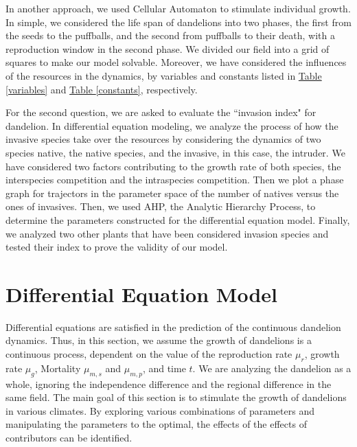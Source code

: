 \documentclass[12pt]{article}
\begin{document}
In another approach, we used Cellular Automaton to stimulate individual growth. In simple, we considered the life span of dandelions into two phases, the first from the seeds to the puffballs, and the second from puffballs to their death, with a reproduction window in the second phase. We divided our field into a grid of squares to make our model solvable. Moreover, we have considered the influences of the resources in the dynamics, by variables and constants listed in \hyperref[variables]{Table \ref*{variables}} and \hyperref[constants]{Table \ref*{constants}}, respectively.

For the second question, we are asked to evaluate the ``invasion index" for dandelion. In differential equation modeling, we analyze the process of how the invasive species take over the resources by considering the dynamics of two species native, the native species, and the invasive, in this case, the intruder. We have considered two factors contributing to the growth rate of both species, the interspecies competition and the intraspecies competition. Then we plot a phase graph for trajectors in the parameter space of the number of natives versus the ones of invasives. Then, we used AHP, the Analytic Hierarchy Process, to determine the parameters constructed for the differential equation model. Finally, we analyzed two other plants that have been considered invasion species and tested their index to prove the validity of our model.

\section{Differential Equation Model}
Differential equations are satisfied in the prediction of the continuous dandelion dynamics. Thus, in this section, we assume the growth of dandelions is a continuous process, dependent on the value of the reproduction rate $\mu_r$, growth rate $\mu_g$, Mortality $\mu_{m,s}$ and $\mu_{m,p}$, and time $t$. We are analyzing the dandelion as a whole, ignoring the independence difference and the regional difference in the same field. The main goal of this section is to stimulate the growth of dandelions in various climates. By exploring various combinations of parameters and manipulating the parameters to the optimal, the effects of the effects of contributors can be identified.
\end{document}
